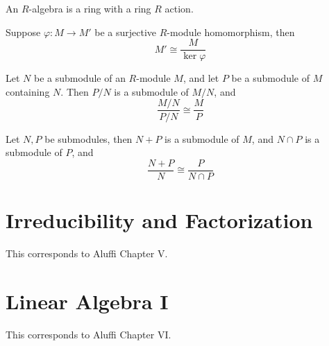 \documentclass[openany]{book}
\begin{document}
\begin{defn}
    An $R$-algebra is a ring with a ring $R$ action.
\end{defn}

\begin{thm}
    Suppose $\varphi: M\to M'$ be a surjective $R$-module homomorphism, then 
    \begin{equation*}
        M'\cong\frac{M}{\ker\varphi}
    \end{equation*}
\end{thm}

\begin{prop}
    Let $N$ be a submodule of an $R$-module $M$, and let $P$ be a submodule of $M$ containing $N$. Then $P/N$ is a submodule of $M/N$, and 
    \begin{equation*}
        \frac{M/N}{P/N}\cong\frac{M}{P}
    \end{equation*}
\end{prop}

\begin{prop}
    Let $N,P$ be submodules, then $N+P$ is a submodule of $M$, and $N\cap P$ is a submodule of $P$, and 
    \begin{equation*}
        \frac{N+P}{N}\cong\frac{P}{N\cap P}
    \end{equation*}
\end{prop}






































\chapter{Irreducibility and Factorization}
This corresponds to Aluffi Chapter V.

\chapter{Linear Algebra I}
This corresponds to Aluffi Chapter VI.
\end{document}
